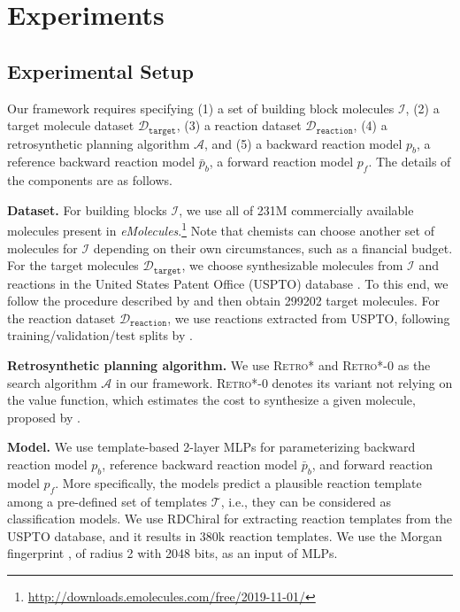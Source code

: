 \section{Experiments}

\subsection{Experimental Setup}







Our framework requires specifying 
(1) a set of building block molecules $\mathcal{I}$, (2) a target molecule dataset $\mathcal{D}_{\mathtt{target}}$, (3) a reaction dataset $\mathcal{D}_{\mathtt{reaction}}$, (4) a retrosynthetic planning algorithm $\mathcal{A}$, and (5) a backward reaction model $p_{b}$, a reference backward reaction model $\bar{p}_{b}$, a forward reaction model $p_{f}$. The details of the components are as follows.


\textbf{Dataset.}
For building blocks $\mathcal{I}$, we use all of 231M commercially available molecules present in \emph{eMolecules}.\footnote{\url{http://downloads.emolecules.com/free/2019-11-01/}} Note that chemists can choose another set of molecules for $\mathcal{I}$ depending on their own circumstances, such as a financial budget. For the target molecules $\mathcal{D}_\mathtt{target}$, we choose synthesizable molecules from $\mathcal{I}$ and reactions in the United States Patent Office (USPTO) database \citep{lowe2012extraction}. To this end, we follow the procedure described by \citet{chen2020retro} and then obtain 299202 target molecules. For the reaction dataset $\mathcal{D}_{\mathtt{reaction}}$, we use reactions extracted from USPTO, following training/validation/test splits by \citet{chen2020retro}.

\textbf{Retrosynthetic planning algorithm.}
We use \textsc{Retro*} and \textsc{Retro*-0} \citep{chen2020retro} as the search algorithm $\mathcal{A}$ in our framework. \textsc{Retro*-0} denotes its variant not relying on the value function, which estimates the cost to synthesize a given molecule, proposed by \citet{chen2020retro}. 

\textbf{Model.}
We use template-based 2-layer MLPs \cite{segler2017neural} for parameterizing backward reaction model $p_{b}$, reference backward reaction model $\bar{p}_{b}$, and forward reaction model $p_{f}$. More specifically, the models predict a plausible reaction template among a pre-defined set of templates $\mathcal{T}$, i.e., they can be considered as classification models. 
We use RDChiral \citep{coley2019rdchiral} for extracting reaction templates from the USPTO database, and it results in 380k reaction templates. We use the Morgan fingerprint \citep{rogers2010extended}, of radius 2 with 2048 bits, as an input of MLPs.

